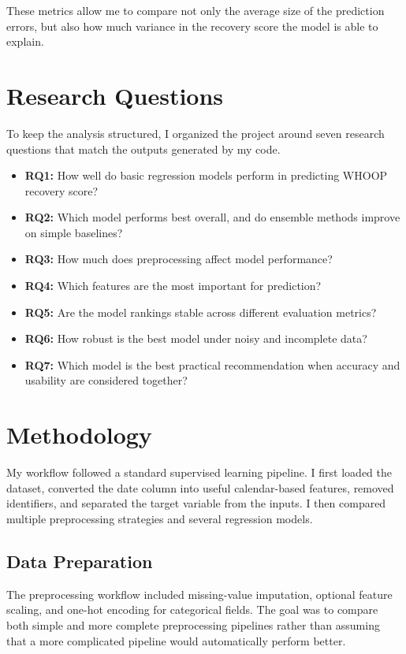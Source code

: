 \documentclass[conference]{IEEEtran}
\begin{document}
These metrics allow me to compare not only the average size of the prediction errors, but also how much variance in the recovery score the model is able to explain.

\section{Research Questions}
To keep the analysis structured, I organized the project around seven research questions that match the outputs generated by my code.

\begin{itemize}
  \item \textbf{RQ1:} How well do basic regression models perform in predicting WHOOP recovery score?
  \item \textbf{RQ2:} Which model performs best overall, and do ensemble methods improve on simple baselines?
  \item \textbf{RQ3:} How much does preprocessing affect model performance?
  \item \textbf{RQ4:} Which features are the most important for prediction?
  \item \textbf{RQ5:} Are the model rankings stable across different evaluation metrics?
  \item \textbf{RQ6:} How robust is the best model under noisy and incomplete data?
  \item \textbf{RQ7:} Which model is the best practical recommendation when accuracy and usability are considered together?
\end{itemize}

\section{Methodology}
My workflow followed a standard supervised learning pipeline. I first loaded the dataset, converted the date column into useful calendar-based features, removed identifiers, and separated the target variable from the inputs. I then compared multiple preprocessing strategies and several regression models.

\subsection{Data Preparation}
The preprocessing workflow included missing-value imputation, optional feature scaling, and one-hot encoding for categorical fields. The goal was to compare both simple and more complete preprocessing pipelines rather than assuming that a more complicated pipeline would automatically perform better.
\end{document}
